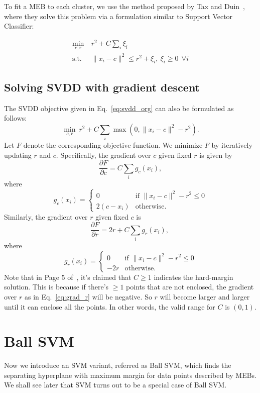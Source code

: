 \documentclass[12pt]{article}
\begin{document}
To fit a MEB to each cluster, we use the method proposed by Tax and Duin~\cite{tax04}, where they solve this problem via a formulation similar to Support Vector Classifier:

\begin{align}
\min_{c,r} ~& r^2 + C\sum_i \xi_i \nonumber\\
\text{s.t.} ~& \| x_i - c \|^2 \le r^2 + \xi_i, ~\xi_i \ge 0~ ~\forall i
\label{eq:svdd_org}
\end{align}

\subsection{Solving SVDD with gradient descent}
\label{sec:svdd}
The SVDD objective given in Eq.~\ref{eq:svdd_org} can also be formulated as follows:
\begin{equation}
\min_{c,r} ~r^2 + C\sum_i \max(0, \| x_i - c\|^2 - r^2).
\end{equation}
Let $F$ denote the corresponding objective function. We minimize $F$ by iteratively updating $r$ and $c$. Specifically, the gradient over $c$ given fixed $r$ is given by
$$
\frac{\partial F}{\partial c} = C\sum_i g_c(x_i),
$$
where
$$
g_c(x_i) =
  \begin{cases}
   0 & \text{if } \| x_i - c\|^2 - r^2 \le 0  \\
   2(c - x_i) & \text{otherwise}.
  \end{cases}
$$
Similarly, the gradient over $r$ given fixed $c$ is 
$$
\frac{\partial F}{\partial r} = 2r + C\sum_i g_r(x_i),~\label{eq:grad_r}
$$
where
$$
g_r(x_i) =
  \begin{cases}
   0 & \text{if } \| x_i - c\|^2 - r^2 \le 0  \\
   -2r & \text{otherwise}.
  \end{cases}
$$
Note that in Page 5 of~\cite{tax04}, it's claimed that $C \ge 1$ indicates the hard-margin solution. This is because if there's $\ge 1$ points that are not enclosed, the gradient over $r$ as in Eq.~\ref{eq:grad_r} will be negative. So $r$ will become larger and larger until it can enclose all the points. In other words, the valid range for $C$ is $(0, 1)$.

\section{Ball SVM}
Now we introduce an SVM variant, referred as Ball SVM, which finds the separating hyperplane with maximum margin for data points described by MEBs. We shall see later that SVM turns out to be a special case of Ball SVM. 
\end{document}
